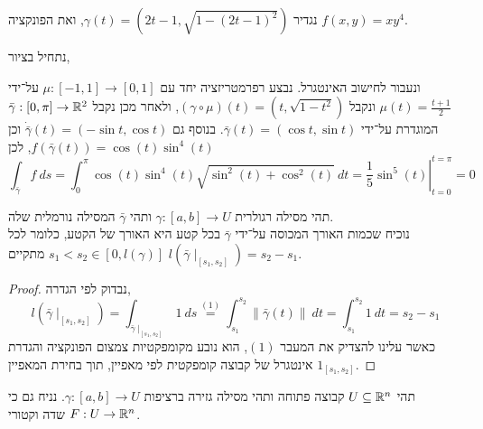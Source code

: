 \subquestion{}
נגדיר $\gamma(t) = (2t - 1, \sqrt{1 - {(2t - 1)}^2})$, ואת הפונקציה $f(x, y) = x y^4$.
\begin{solution}
	נתחיל בציור,
	\begin{otherlanguage}{english}
		\begin{center}
		\end{center}
	\end{otherlanguage}
	ונעבור לחישוב האינטגרל.
	נבצע רפרמטריזציה יחד עם $\mu : [-1, 1] \to [0, 1]$ על־ידי $\mu(t) = \frac{t + 1}{2}$ ונקבל $(\gamma \circ \mu)(t) = (t, \sqrt{1 - t^2})$,
	ולאחר מכן נקבל $\bar{\gamma} : [0, \pi] \to \mathbb{R}^2$ המוגדרת על־ידי $\bar{\gamma}(t) = (\cos t, \sin t)$.
	בנוסף גם $\dot{\bar{\gamma}}(t) = (-\sin t, \cos t)$ וכן $f(\bar{\gamma}(t)) = \cos(t) \sin^4(t)$, לכן
	\[
		\int_{\bar{\gamma}} f\ ds
		= \int_0^\pi \cos(t) \sin^4(t) \sqrt{\sin^2(t) + \cos^2(t)}\ dt
		= \left. \frac{1}{5} \sin^5(t) \right\rvert_{t = 0}^{t = \pi}
		= 0
	\]
\end{solution}

\question{}
תהי מסילה רגולרית $\gamma : [a, b] \to U$ ותהי $\bar{\gamma}$ המסילה נורמלית שלה. \\
נוכיח שכמות האורך המכוסה על־ידי $\bar{\gamma}$ בכל קטע היא האורך של הקטע, כלומר לכל $s_1 < s_2 \in [0, l(\gamma)]$ מתקיים $l(\bar{\gamma} \mid_{[s_1, s_2]}) = s_2 - s_1$.
\begin{proof}
	נבדוק לפי הגדרה,
	\[
		l(\bar{\gamma}\mid_{[s_1, s_2]})
		= \int_{\bar{\gamma}\mid_{[s_1, s_2]}} 1\ ds
		\overset{(1)}{=} \int_{s_1}^{s_2} \lVert \bar{\gamma}(t) \rVert\ dt
		= \int_{s_1}^{s_2} 1\ dt
		= s_2 - s_1
	\]
	כאשר עלינו להצדיק את המעבר $(1)$, הוא נובע מקומפקטיות צמצום הפונקציה והגדרת אינטגרל של קבוצה קומפקטית לפי מאפיין, תוך בחירת המאפיין $1_{[s_1, s_2]}$.
\end{proof}

\question{}
תהי $U \subseteq \mathbb{R}^n$ קבוצה פתוחה ותהי מסילה גזירה ברציפות $\gamma : [a, b] \to U$.
נניח גם כי $F : U \to \mathbb{R}^n$ שדה וקטורי.

